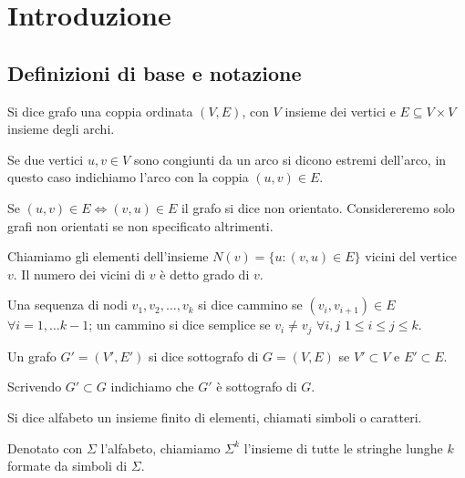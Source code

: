 


\chapter{Introduzione}

\section{Definizioni di base e notazione}

\begin{definizione}\label{def:grafo}
	Si dice grafo una coppia ordinata $(V, E)$, con $V$ insieme dei vertici e $E \subseteq V \times V$ insieme degli archi.
\end{definizione}
	
	Se due vertici $u, v \in V$ sono congiunti da un arco si dicono estremi dell'arco, in questo caso indichiamo l'arco con la coppia $(u, v) \in E$.
	
	Se $(u,v) \in E \Leftrightarrow (v,u) \in E$ il grafo si dice non orientato. Considereremo solo grafi non orientati se non specificato altrimenti.
	
	Chiamiamo gli elementi dell'insieme $N(v) = \{ u : (v,u) \in E \}$ vicini del vertice $v$. Il numero dei vicini di $v$ è detto grado di $v$.
	
	Una sequenza di nodi $v_{1}, v_{2}, \ldots, v_{k}$ si dice cammino se $(v_{i}, v_{i+1}) \in E$ $\forall i = 1, \ldots k-1$; un cammino si dice semplice se $v_{i} \neq v_{j}$ $\forall i,j$ $1 \leq i \le j \leq k$.

\begin{definizione}\label{def:sottografo}
	Un grafo $G' = (V', E')$ si dice sottografo di $G = (V, E)$ se $V' \subset V$ e $E' \subset E$.
\end{definizione}
	
	Scrivendo $G' \subset G$ indichiamo che $G'$ è sottografo di $G$.
	
\begin{definizione}\label{def:alfabeto}
	Si dice alfabeto un insieme finito di elementi, chiamati simboli o caratteri.
\end{definizione}
	
	Denotato con $\Sigma$ l'alfabeto, chiamiamo $\Sigma^{k}$ l'insieme di tutte le stringhe lunghe $k$ formate da simboli di $\Sigma$.
	
